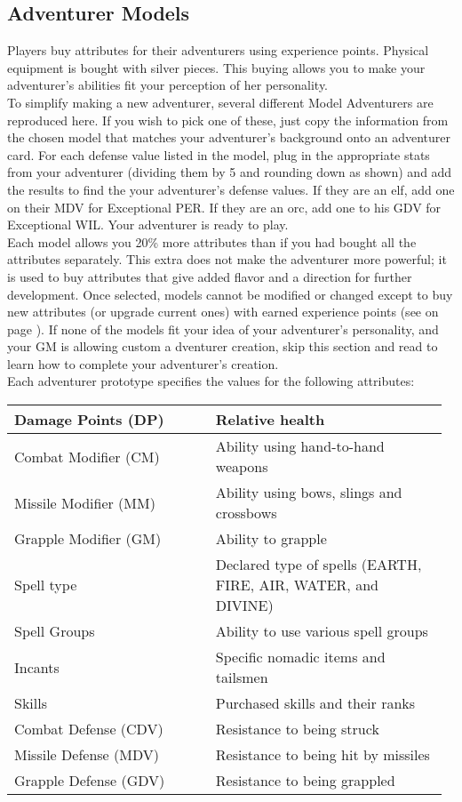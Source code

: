 \begin{multicols*}{2}
\section{Adventurer Models}
Players buy attributes for their adventurers using experience points. Physical equipment is bought with silver pieces. This buying allows you to make your adventurer's abilities fit your perception of her personality.\\
To simplify making a new adventurer, several different Model Adventurers are reproduced here. If you wish to pick one of these, just copy the information from the chosen model that matches your adventurer's background onto an adventurer card. For each defense value listed in the model, plug in the appropriate stats from your adventurer (dividing them by 5 and rounding down as shown) and add the results to find the your adventurer's defense values. If they are an elf, add one on their MDV for Exceptional PER. If they are an orc, add one to his GDV for Exceptional WIL. Your adventurer is ready to play.\\
Each model allows you 20\% more attributes than if you had bought all the attributes separately. This extra does not make the adventurer more powerful; it is used to buy attributes that give added flavor and a direction for further development. Once selected, models cannot be modified or changed except to buy new attributes (or upgrade current ones) with earned experience points (see  on page \textbf{\pageref{create-buying}}).
If none of the models fit your idea of your adventurer's personality, and your GM is allowing custom a dventurer creation, skip this section and read  to learn how to complete your adventurer's creation.\\
Each adventurer prototype specifies the values for the following attributes:

\noindent\begin{tabular}{@{}p{0.45\linewidth} p{0.52\linewidth}}
Damage Points (DP) & Relative health\\
\midrule
Combat Modifier (CM) & Ability using hand-to-hand weapons\\
\midrule
Missile Modifier (MM) & Ability using bows, slings and crossbows\\
\midrule
Grapple Modifier (GM) & Ability to grapple\\
\midrule
Spell type & Declared type of spells (EARTH, FIRE, AIR, WATER, and DIVINE)\\
\midrule
Spell Groups & Ability to use various spell groups\\
\midrule
Incants & Specific nomadic items and tailsmen\\
\midrule
Skills & Purchased skills and their ranks\\
\midrule
Combat Defense (CDV) & Resistance to being struck\\
\midrule
Missile Defense (MDV) & Resistance to being hit by missiles\\
\midrule
Grapple Defense (GDV) & Resistance to being grappled\\
\end{tabular}


\end{multicols*}
